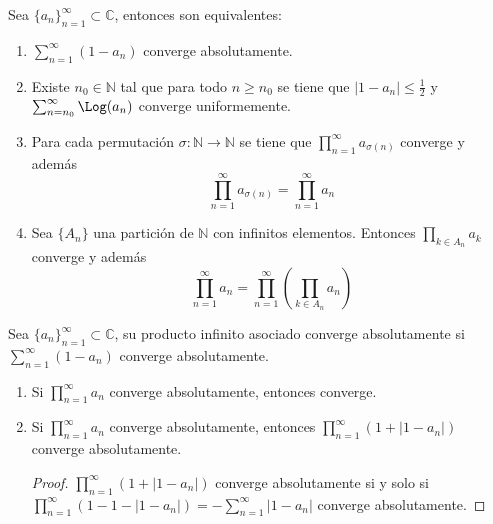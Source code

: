 \begin{theorem}
    Sea $\{a_n\}_{n=1}^\infty \subset \mathbb{C}$, entonces son equivalentes:
    \begin{enumerate}
        \item $\sum_{n=1}^\infty (1-a_n)$ converge absolutamente.
        \item Existe $n_0 \in \mathbb{N}$ tal que para todo $n \geq n_0$ se tiene que $|1-a_n| \leq \frac{1}{2}$ y $\sum_{n=n_0}^\infty \Log(a_n)$ converge uniformemente.
        \item Para cada permutación $\sigma: \mathbb{N} \to \mathbb{N}$ se tiene que $\prod_{n=1}^\infty a_{\sigma(n)}$ converge y además
              $$\prod_{n=1}^\infty a_{\sigma(n)} = \prod_{n=1}^\infty a_n$$
        \item Sea $\{A_n\}$ una partición de $\mathbb{N}$ con infinitos elementos.
              Entonces $\prod_{k \in A_n} a_k$ converge y además
              $$\prod_{n=1}^\infty a_n = \prod_{n=1}^\infty \left(\prod_{k \in A_n} a_n\right)$$
    \end{enumerate}
\end{theorem}

\begin{definition}
    Sea $\{a_n\}_{n=1}^\infty \subset \mathbb{C}$, su producto infinito asociado converge absolutamente si $\sum_{n=1}^\infty (1-a_n)$ converge absolutamente.
\end{definition}

\begin{remark}
    \hfill
    \begin{enumerate}
        \item Si $\prod_{n=1}^\infty a_n$ converge absolutamente, entonces converge.
        \item Si $\prod_{n=1}^\infty a_n$ converge absolutamente, entonces $\prod_{n=1}^\infty \left(1 + |1-a_n|\right)$ converge absolutamente.
              \begin{proof}
                  $\prod_{n=1}^\infty \left(1 + |1-a_n|\right)$ converge absolutamente si y solo si $\prod_{n=1}^\infty \left(1 - 1 - |1-a_n|\right) = -\sum_{n=1}^\infty |1-a_n|$ converge absolutamente.
              \end{proof}
    \end{enumerate}
\end{remark}

